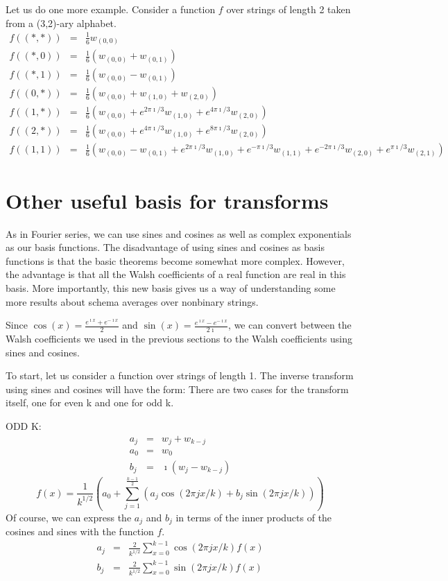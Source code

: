Let us do one more example.  Consider a function $f$ over strings of length
2 taken from a (3,2)-ary alphabet.
\begin{eqnarray}
f((*,*))&=& \frac{1}{6} w_{(0,0)} \nonumber \\
f((*,0))&=& \frac{1}{6} (w_{(0,0)}+w_{(0,1)}) \nonumber \\
f((*,1))&=& \frac{1}{6} (w_{(0,0)}-w_{(0,1)}) \nonumber \\
f((0,*))&=& \frac{1}{6} (w_{(0,0)}+w_{(1,0)}+w_{(2,0)}) \nonumber \\
f((1,*))&=& \frac{1}{6} (w_{(0,0)}+e^{2 \pi \imath/3} w_{(1,0)} +
				e^{4 \pi  \imath/3} w_{(2,0)}) \nonumber \\
f((2,*))&=& \frac{1}{6} (w_{(0,0)}+e^{4 \pi \imath/3} w_{(1,0)} +
				e^{8 \pi \imath/3} w_{(2,0)}) \nonumber \\
f((1,1))&=& \frac{1}{6} (w_{(0,0)}-w_{(0,1)} + e^{2 \pi \imath/3} w_{(1,0)}
			+ e^{- \pi \imath/3} w_{(1,1)} 
			+ e^{-2 \pi \imath/3} w_{(2,0)}
			+ e^{\pi \imath/3} w_{(2,1)})
\end{eqnarray}

\section{Other useful basis for transforms}

As in Fourier series, we can use sines and cosines as well as complex
exponentials as our basis functions.  The disadvantage of using sines
and cosines as basis functions is that the basic theorems become somewhat
more complex.  However, the advantage is that all the Walsh coefficients
of a real function are real in this basis.  More importantly, this
new basis gives us a way of understanding some more results about schema
averages over nonbinary strings.

Since $\cos(x)=\frac{e^{\imath x}+e^{-\imath x}}{2}$ and
$\sin(x)=\frac{e^{\imath x}-e^{-\imath x}}{2 \imath}$,
we can convert between the Walsh coefficients we used in the previous
sections to the Walsh coefficients using sines and cosines.

To start, let us consider a function over strings of length 1.  The
inverse transform using sines and cosines will have the form:
There are two cases for the transform itself, one for even k and one for odd k.

ODD K:
\begin{eqnarray}
a_j &=& w_j + w_{k-j} \nonumber \\
a_0 &=& w_0 \nonumber \\
b_j &=& \imath (w_j - w_{k-j})
\end{eqnarray}
\begin{equation}
f(x)=\frac{1}{k^{1/2}}(a_0+\sum_{j=1}^{\frac{k-1}{2}}{(a_j \cos(2 \pi j x/k) +
	 b_j \sin(2 \pi j x/k))})
\end{equation}
Of course, we can express the $a_j$ and $b_j$ in terms of the inner products
of the cosines and sines with the function $f$.
\begin{eqnarray}
a_j &=& \frac{2}{k^{1/2}} \sum_{x=0}^{k-1} {\cos(2 \pi j x/k) f(x)} \nonumber \\
b_j &=& \frac{2}{k^{1/2}} \sum_{x=0}^{k-1} {\sin(2 \pi j x/k) f(x)}
\end{eqnarray}

